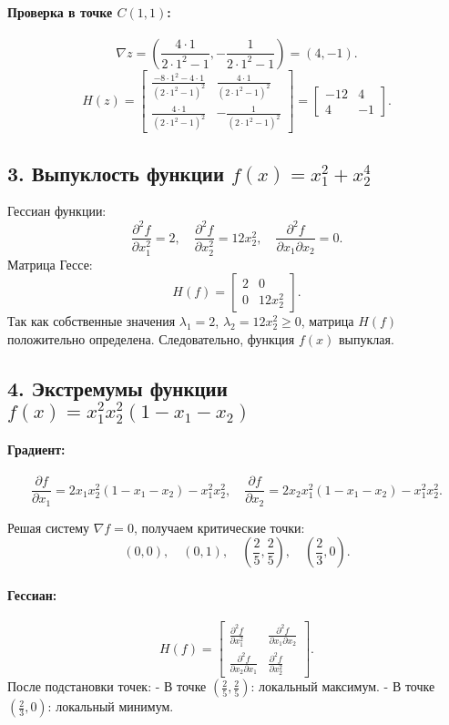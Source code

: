 \documentclass[a4paper,12pt]{article}
\begin{document}
\paragraph{Проверка в точке \( C(1, 1) \):}
\[
\nabla z = \left( \frac{4 \cdot 1}{2 \cdot 1^2 - 1}, -\frac{1}{2 \cdot 1^2 - 1} \right) = (4, -1).
\]
\[
H(z) =
\begin{bmatrix}
\frac{-8 \cdot 1^2 - 4 \cdot 1}{(2 \cdot 1^2 - 1)^2} & \frac{4 \cdot 1}{(2 \cdot 1^2 - 1)^2} \\
\frac{4 \cdot 1}{(2 \cdot 1^2 - 1)^2} & -\frac{1}{(2 \cdot 1^2 - 1)^2}
\end{bmatrix} =
\begin{bmatrix}
-12 & 4 \\
4 & -1
\end{bmatrix}.
\]

\subsection*{3. Выпуклость функции \( f(x) = x_1^2 + x_2^4 \)}

Гессиан функции:
\[
\frac{\partial^2 f}{\partial x_1^2} = 2, \quad
\frac{\partial^2 f}{\partial x_2^2} = 12x_2^2, \quad
\frac{\partial^2 f}{\partial x_1 \partial x_2} = 0.
\]
Матрица Гессе:
\[
H(f) =
\begin{bmatrix}
2 & 0 \\
0 & 12x_2^2
\end{bmatrix}.
\]
Так как собственные значения \( \lambda_1 = 2 \), \( \lambda_2 = 12x_2^2 \geq 0 \), матрица \( H(f) \) положительно определена. Следовательно, функция \( f(x) \) выпуклая.

\subsection*{4. Экстремумы функции \( f(x) = x_1^2 x_2^2 (1 - x_1 - x_2) \)}

\paragraph{Градиент:}
\[
\frac{\partial f}{\partial x_1} = 2x_1 x_2^2 (1 - x_1 - x_2) - x_1^2 x_2^2, \quad
\frac{\partial f}{\partial x_2} = 2x_2 x_1^2 (1 - x_1 - x_2) - x_1^2 x_2^2.
\]

Решая систему \(\nabla f = 0\), получаем критические точки:
\[
(0, 0), \quad (0, 1), \quad \left(\frac{2}{5}, \frac{2}{5}\right), \quad \left(\frac{2}{3}, 0\right).
\]

\paragraph{Гессиан:}
\[
H(f) =
\begin{bmatrix}
\frac{\partial^2 f}{\partial x_1^2} & \frac{\partial^2 f}{\partial x_1 \partial x_2} \\
\frac{\partial^2 f}{\partial x_2 \partial x_1} & \frac{\partial^2 f}{\partial x_2^2}
\end{bmatrix}.
\]
После подстановки точек:
- В точке \( \left(\frac{2}{5}, \frac{2}{5}\right) \): локальный максимум.
- В точке \( \left(\frac{2}{3}, 0\right) \): локальный минимум.
\end{document}
